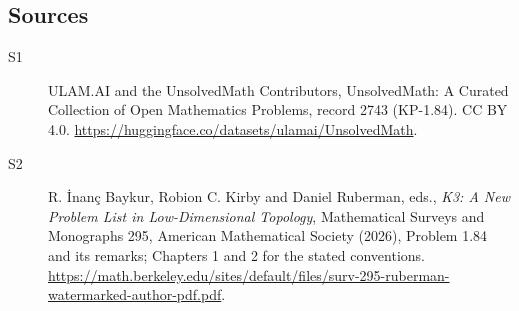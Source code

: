 \documentclass[11pt]{article}
\begin{document}
\subsection{Sources}
\begin{description}
\item[\hypertarget{source:2743:1}{S1}] ULAM.AI and the UnsolvedMath Contributors, UnsolvedMath: A Curated Collection of Open Mathematics Problems, record 2743 (KP-1.84). CC BY 4.0. \url{https://huggingface.co/datasets/ulamai/UnsolvedMath}.
\item[\hypertarget{source:2743:2}{S2}] R. İnanç Baykur, Robion C. Kirby and Daniel Ruberman, eds., \emph{K3: A New Problem List in Low-Dimensional Topology}, Mathematical Surveys and Monographs 295, American Mathematical Society (2026), Problem 1.84 and its remarks; Chapters 1 and 2 for the stated conventions. \url{https://math.berkeley.edu/sites/default/files/surv-295-ruberman-watermarked-author-pdf.pdf}.
\end{description}
\label{end:2743}
\end{document}
